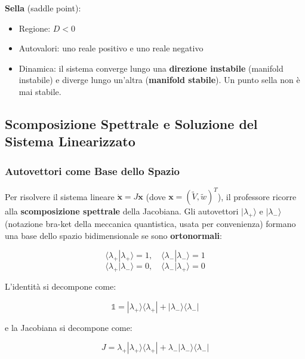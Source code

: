 \textbf{Sella} (saddle point):
\begin{itemize}
    \item Regione: $D < 0$
    \item Autovalori: uno reale positivo e uno reale negativo
    \item Dinamica: il sistema converge lungo una \textbf{direzione instabile} (manifold instabile) e diverge lungo un'altra (\textbf{manifold stabile}). Un punto sella non è mai stabile.
\end{itemize}


\subsection{Scomposizione Spettrale e Soluzione del Sistema Linearizzato}

\subsubsection{Autovettori come Base dello Spazio}

Per risolvere il sistema lineare $\dot{\mathbf{x}} = J \mathbf{x}$ (dove $\mathbf{x} = (\tilde{V}, \tilde{w})^T$), il professore ricorre alla \textbf{scomposizione spettrale} della Jacobiana. Gli autovettori $|\lambda_+\rangle$ e $|\lambda_-\rangle$ (notazione bra-ket della meccanica quantistica, usata per convenienza) formano una base dello spazio bidimensionale se sono \textbf{ortonormali}:

\begin{equation}
\langle \lambda_+ | \lambda_+ \rangle = 1, \quad \langle \lambda_- | \lambda_- \rangle = 1
\end{equation}
\begin{equation}
\langle \lambda_+ | \lambda_- \rangle = 0, \quad \langle \lambda_- | \lambda_+ \rangle = 0
\end{equation}

L'identità si decompone come:

\begin{equation}
\mathbb{1} = |\lambda_+\rangle\langle \lambda_+| + |\lambda_-\rangle\langle \lambda_-|
\end{equation}

e la Jacobiana si decompone come:

\begin{equation}
J = \lambda_+ |\lambda_+\rangle\langle \lambda_+| + \lambda_- |\lambda_-\rangle\langle \lambda_-|
\end{equation}


